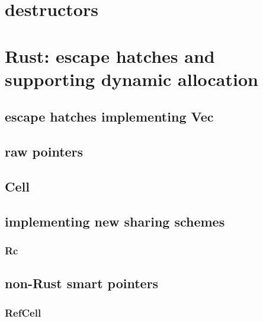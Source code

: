 \section{destructors}


\section{Rust: escape hatches and supporting dynamic allocation}


\subsection{escape hatches implementing Vec}


\subsection{raw pointers}



\subsection{Cell}


\subsection{implementing new sharing schemes}
\subsubsection{Rc}


\subsection{non-Rust smart pointers}


\subsubsection{RefCell}


